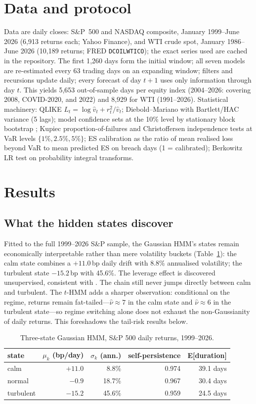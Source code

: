 \documentclass[11pt]{article}
\begin{document}
\section{Data and protocol}
Data are daily closes: S\&P~500 and NASDAQ composite, January 1999--June
2026 (6{,}913 returns each; Yahoo Finance), and WTI crude spot, January
1986--June 2026 (10{,}189 returns; FRED \texttt{DCOILWTICO}); the exact
series used are cached in the repository. The first 1{,}260 days form the
initial window; all seven models are re-estimated every 63 trading days on
an expanding window; filters and recursions update daily; every forecast of
day $t{+}1$ uses only information through day $t$. This yields 5{,}653
out-of-sample days per equity index (2004--2026: covering 2008, COVID-2020,
and 2022) and 8{,}929 for WTI (1991--2026). Statistical machinery: QLIKE
$L_t=\log\hat v_t + r_t^2/\hat v_t$; Diebold--Mariano with Bartlett/HAC
variance (5 lags); model confidence sets at the 10\% level by stationary
block bootstrap \citep{hansen2011, politis1994}; Kupiec
proportion-of-failures and Christoffersen independence tests at VaR levels
$\{1\%, 2.5\%, 5\%\}$; ES calibration as the ratio of mean realised loss
beyond VaR to mean predicted ES on breach days (1 = calibrated); Berkowitz
LR test on probability integral transforms.

\section{Results}
\subsection{What the hidden states discover}
Fitted to the full 1999--2026 S\&P sample, the Gaussian HMM's states remain
economically interpretable rather than mere volatility buckets
(Table~\ref{tab:states}): the calm state combines a $+11.0$\,bp daily drift
with 8.8\% annualised volatility; the turbulent state $-15.2$\,bp with
45.6\%. The leverage effect is discovered unsupervised, consistent with
\citet{ryden1998}. The chain still never jumps directly between calm and
turbulent. The $t$-HMM adds a sharper observation: conditional on the
regime, returns remain fat-tailed---$\hat\nu\approx7$ in the calm state and
$\hat\nu\approx6$ in the turbulent state---so regime switching alone does
not exhaust the non-Gaussianity of daily returns. This foreshadows the
tail-risk results below.

\begin{table}[t]
\centering
\caption{Three-state Gaussian HMM, S\&P 500 daily returns, 1999--2026.}
\label{tab:states}
\begin{tabular}{lrrrr}
\toprule
state & $\mu_k$ (bp/day) & $\sigma_k$ (ann.) & self-persistence & E[duration] \\
\midrule
calm      & $+11.0$ & 8.8\%  & 0.974 & 39.1 days \\
normal    & $-0.9$  & 18.7\% & 0.967 & 30.4 days \\
turbulent & $-15.2$ & 45.6\% & 0.959 & 24.5 days \\
\bottomrule
\end{tabular}
\end{table}
\end{document}
